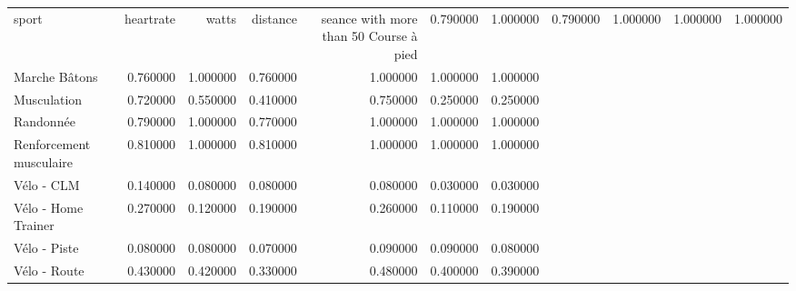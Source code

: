 \begin{tabular}{lrrrrrr}
\toprule
sport & heartrate & watts & distance & seance with more than 50%
\midrule
Course à pied & 0.790000 & 1.000000 & 0.790000 & 1.000000 & 1.000000 & 1.000000 \\
Marche Bâtons & 0.760000 & 1.000000 & 0.760000 & 1.000000 & 1.000000 & 1.000000 \\
Musculation & 0.720000 & 0.550000 & 0.410000 & 0.750000 & 0.250000 & 0.250000 \\
Randonnée & 0.790000 & 1.000000 & 0.770000 & 1.000000 & 1.000000 & 1.000000 \\
Renforcement musculaire & 0.810000 & 1.000000 & 0.810000 & 1.000000 & 1.000000 & 1.000000 \\
Vélo - CLM & 0.140000 & 0.080000 & 0.080000 & 0.080000 & 0.030000 & 0.030000 \\
Vélo - Home Trainer & 0.270000 & 0.120000 & 0.190000 & 0.260000 & 0.110000 & 0.190000 \\
Vélo - Piste & 0.080000 & 0.080000 & 0.070000 & 0.090000 & 0.090000 & 0.080000 \\
Vélo - Route & 0.430000 & 0.420000 & 0.330000 & 0.480000 & 0.400000 & 0.390000 \\
\bottomrule
\end{tabular}
